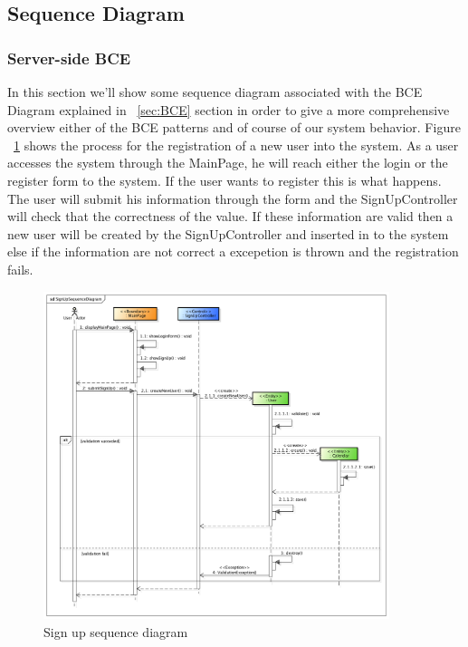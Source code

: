 \subsection{Sequence Diagram}
\subsubsection{Server-side BCE}
In this section we'll show some sequence diagram associated with the BCE Diagram explained in ~\ref{sec:BCE} section in order to give  a more comprehensive overview either of the BCE patterns and of course of our system behavior.
Figure ~\ref{fig:signupSeq} shows the process for the registration of a new user into the system. As a user accesses the system through the MainPage, he will reach either the login or the register form to the system. If the user wants to register this is what happens.
The user will submit his information through the form and the SignUpController will check that the correctness of the value. If these information are valid then a new user will be created by the SignUpController and inserted in to the system else if the information are not correct a excepetion is thrown and the registration fails. 
\begin{center}
 \begin{figure}[H]
    \includegraphics[width=0.9\textwidth]{../BCEDiagram/BCE/EntityOverview/SignUpSequenceDiagram.png}
    \caption{Sign up sequence diagram}
     \label{fig:signupSeq}
     \end{figure}
   \end{center}  
  
